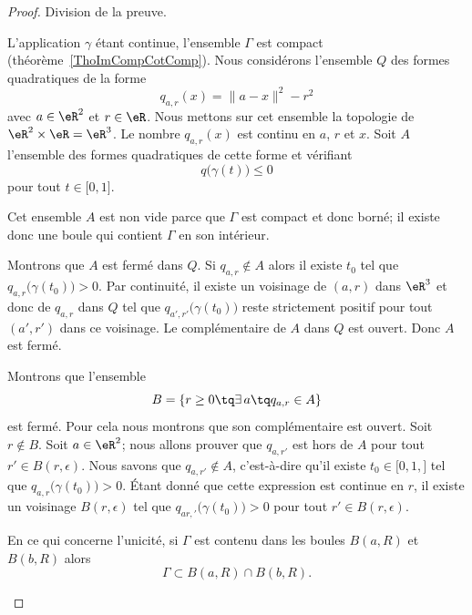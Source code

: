 \begin{proof}
	Division de la preuve.
	\begin{subproof}
		\spitem[Existence]
		L'application \( \gamma\) étant continue, l'ensemble \( \Gamma\) est compact (théorème~\ref{ThoImCompCotComp}). Nous considérons l'ensemble \( Q\) des formes quadratiques de la forme
		\begin{equation}
			q_{a,r}(x)=\| a-x \|^2-r^2
		\end{equation}
		avec \( a\in \eR^2\) et \( r\in \eR\). Nous mettons sur cet ensemble la topologie de \( \eR^2\times \eR=\eR^3\). Le nombre \( q_{a,r}(x)\) est continu en \( a\), \( r\) et \( x\). Soit \( A\) l'ensemble des formes quadratiques de cette forme et vérifiant
		\begin{equation}
			q\big( \gamma(t) \big)\leq 0
		\end{equation}
		pour tout \( t\in\mathopen[ 0 , 1 \mathclose]\).

		Cet ensemble \( A\) est non vide parce que \( \Gamma \) est compact et donc borné; il existe donc une boule qui contient \( \Gamma\) en son intérieur.

		Montrons que \( A\) est fermé dans \( Q\). Si \( q_{a,r}\notin A\) alors il existe \( t_0\) tel que \( q_{a,r}\big( \gamma(t_0) \big)>0\). Par continuité, il existe un voisinage de \( (a,r)\) dans \( \eR^3\)  et donc de \( q_{a,r}\) dans \( Q\) tel que \( q_{a',r'}\big( \gamma(t_0) \big)\) reste strictement positif pour tout \( (a',r')\) dans ce voisinage. Le complémentaire de \( A\) dans \( Q\) est ouvert. Donc \( A\) est fermé.

		Montrons que l'ensemble
		\begin{equation}
			B=\{ r\geq 0\tq \exists\,a \tq q_{a,r}\in A \}
		\end{equation}
		est fermé. Pour cela nous montrons que son complémentaire est ouvert. Soit \( r\not\in B\). Soit \( a\in \eR^2\); nous allons prouver que \( q_{a,r'}\) est hors de \( A\) pour tout \( r'\in B(r,\epsilon)\). Nous savons que \( q_{a,r'}\not\in A\), c'est-à-dire qu'il existe \( t_0\in \mathopen[ 0,1,\mathclose]\) tel que \( q_{a,r}\big( \gamma(t_0) \big)>0\). Étant donné que cette expression est continue en \( r\), il existe un voisinage \( B(r,\epsilon)\) tel que \( q_{ar,'}\big( \gamma(t_0) \big)>0\) pour tout \( r'\in B(r,\epsilon)\).
		\spitem[Unicité]

		En ce qui concerne l'unicité, si \( \Gamma\) est contenu dans les boules \( B(a,R)\) et \( B(b,R)\) alors
		\begin{equation}
			\Gamma\subset B(a,R)\cap B(b,R).
		\end{equation}


\end{subproof}
\end{proof}
